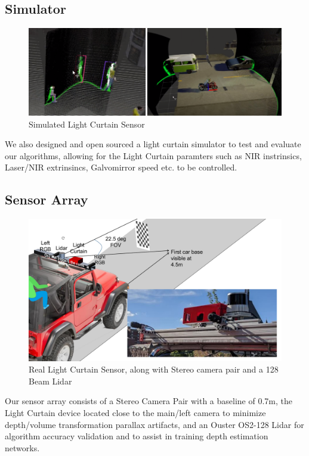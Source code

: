\subsection{Simulator}

\begin{figure}[h]
   \centering
   \begin{minipage}{0.4\textwidth}
       \centering
       \includegraphics[width=1.0\textwidth]{figures/sim.png}
   \end{minipage}\hfill
   \centering
   \caption{Simulated Light Curtain Sensor}
\end{figure}
We also designed and open sourced a light curtain simulator \cite{raaj2019} to test and evaluate our algorithms, allowing for the Light Curtain paramters such as NIR instrinsics, Laser/NIR extrinsincs, Galvomirror speed etc. to be controlled.

\subsection{Sensor Array}

\begin{figure}[h]
   \centering
   \begin{minipage}{0.5\textwidth}
       \centering
       \includegraphics[width=1.0\textwidth]{figures/array.pdf}
   \end{minipage}\hfill
   \centering
   \caption{Real Light Curtain Sensor, along with Stereo camera pair and a 128 Beam Lidar}
\end{figure}

Our sensor array consists of a Stereo Camera Pair with a baseline of 0.7m, the Light Curtain device located close to the main/left camera to minimize depth/volume transformation parallax artifacts, and an Ouster OS2-128 Lidar for algorithm accuracy validation and to assist in training depth estimation networks.